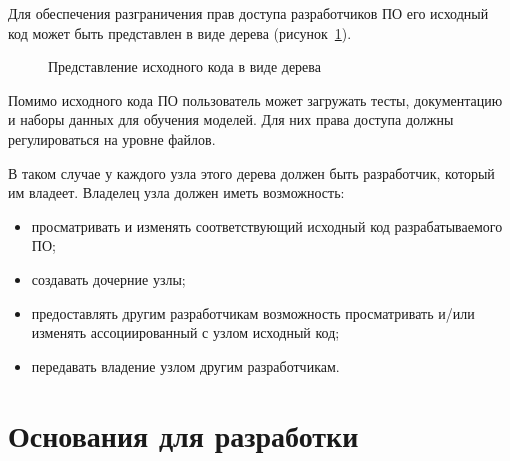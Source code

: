 \documentclass{bmstu}
\begin{document}
  Для обеспечения разграничения прав доступа разработчиков ПО его
  исходный код может быть представлен в виде дерева
  (рисунок~\ref{fig:source-code-tree}).

  \begin{figure}[ht]
    \centering


    \caption{Представление исходного кода в виде дерева}
    \label{fig:source-code-tree}
  \end{figure}

  Помимо исходного кода ПО пользователь может загружать тесты,
  документацию и наборы данных для обучения моделей.
  Для них права доступа должны регулироваться на уровне файлов.

  В таком случае у каждого узла этого дерева должен быть разработчик,
  который им владеет.
  Владелец узла должен иметь возможность:
  \begin{itemize}[label=---]
    \item просматривать и изменять соответствующий исходный код
      разрабатываемого ПО;
    \item создавать дочерние узлы;
    \item предоставлять другим разработчикам возможность просматривать
      и/или изменять ассоциированный с узлом исходный код;
    \item передавать владение узлом другим разработчикам.
  \end{itemize}

  \section{Основания для разработки}
\end{document}
